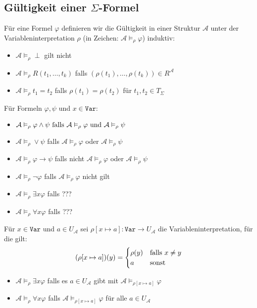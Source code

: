 \documentclass[12pt,a4paper]{report}
\newcommand{\ra}{\rightarrow}
\newcommand{\red}[1]{\textcolor[rgb]{0.9,0.2,0.2}{#1}}
\newcommand{\green}[1]{\textcolor[rgb]{0.1,0.6,0.1}{#1}}
\begin{document}
\subsection{\green{Gültigkeit einer $ \Sigma $-Formel}}
Für eine Formel $ \varphi $ definieren wir die Gültigkeit in einer Struktur $ \mathcal{A} $ unter der Variableninterpretation $ \rho $ (in Zeichen: \red{$ \mathcal{A} \vDash_\rho \varphi $}) induktiv:
\begin{itemize}
    \item $ \mathcal{A} \vDash_\rho \perp $ gilt nicht
    \item $ \mathcal{A} \vDash_\rho R(t_1,\dots,t_k) $ falls $ (\rho(t_1),\dots, \rho(t_k)) \in R^\mathcal{A} $
    \item $ \mathcal{A} \vDash_\rho t_1 = t_2 $ falls $ \rho(t_1) = \rho(t_2) $ für $ t_1, t_2 \in T_\Sigma $
\end{itemize}
Für Formeln $ \varphi, \psi $ und $ x \in \texttt{Var} $:
\begin{itemize}
    \item $ \mathcal{A} \vDash_\rho \varphi \wedge \psi \textnormal{ falls } \mathcal{A}\vDash_\rho \varphi \textnormal{ und } \mathcal{A}\vDash_\rho \psi $
    \item $ \mathcal{A}\vDash_\rho \vee \psi $ falls $ \mathcal{A}\vDash_\rho \varphi $ oder $ \mathcal{A}\vDash_\rho \psi $
    \item $ \mathcal{A}\vDash_\rho \varphi \ra \psi $ falls nicht $ \mathcal{A}\vDash_\rho \varphi $ oder $ \mathcal{A}\vDash_\rho \psi $
    \item $ \mathcal{A}\vDash_\rho \lnot \varphi $ falls $ \mathcal{A}\vDash_\rho \varphi $ nicht gilt
    \item $ \mathcal{A}\vDash_\rho \exists x \varphi $ falls \red{???}
    \item $ \mathcal{A}\vDash_\rho \forall x \varphi $ falls \red{???}
\end{itemize}
Für $ x \in \texttt{Var} $ und $ a \in U_\mathcal{A}   $ sei \red{$ \rho[x \mapsto a]: \texttt{Var} \ra U_\mathcal{A} $} die Variableninterpretation, für die gilt:
\[
    (\rho[x \mapsto a])(y) = \begin{cases}
        \rho(y) & \textnormal{falls } x \neq y\\
        a & \textnormal{sonst}
    \end{cases}
\]
\begin{itemize}
    \item $ \mathcal{A}\vDash_\rho \exists x \varphi $ falls es $ a \in U_\mathcal{A} $ gibt mit $ \mathcal{A}\vDash_{\rho[x \mapsto a]} \varphi $
    \item $ \mathcal{A}\vDash_\rho \forall x \varphi $ falls $ \mathcal{A}\vDash_{\rho[x \mapsto a]} \varphi $ für alle $ a \in U_\mathcal{A} $
\end{itemize}
\end{document}
